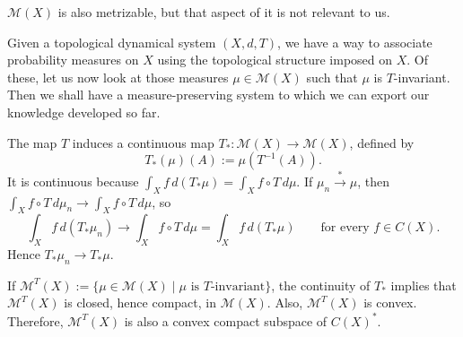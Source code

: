 \documentclass[11pt,a4paper]{article}
\begin{document}
\begin{remark}
$\mathcal M(X)$ is also metrizable, but that aspect of it is not relevant
to us.
\end{remark}

Given a topological dynamical system $(X,d,T)$, we have a way to associate
probability measures on $X$ using the topological structure imposed on $X$.
Of these, let us now look at those measures $\mu\in\mathcal M(X)$ such that
$\mu$ is $T$-invariant. Then we shall have a measure-preserving system to
which we can export our knowledge developed so far.

The map $T$ induces a continuous map $T_*\colon\mathcal M(X)\to\mathcal M(X)$, defined by
\[
 T_*(\mu)(A):=\mu(T^{-1}(A)).
\]
It is continuous because $\int_Xf\,d(T_*\mu)=\int_Xf\circ T\,d\mu$. If $\mu_n\xrightarrow{*}\mu$, then $\int_Xf\circ T\,d\mu_n\to\int_Xf\circ T\,d\mu$, so
\[
 \int_Xf\,d(T_*\mu_n)\longrightarrow\int_Xf\circ T\,d\mu
 =\int_Xf\,d(T_*\mu)
 \qquad\text{for every }f\in C(X).
\]
Hence $T_*\mu_n\to T_*\mu$.

If $\mathcal M^T(X):=\{\mu\in\mathcal M(X)\mid\mu\text{ is $T$-invariant}\}$, the continuity of $T_*$ implies that $\mathcal M^T(X)$ is closed, hence compact, in $\mathcal M(X)$. Also, $\mathcal M^T(X)$ is convex. Therefore, $\mathcal M^T(X)$ is also a convex compact subspace of $C(X)^*$.
\end{document}

